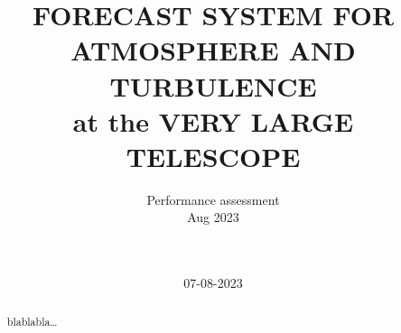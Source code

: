 \documentclass[a4paper]{article}
\title{FORECAST SYSTEM FOR ATMOSPHERE AND TURBULENCE\\
at the VERY LARGE TELESCOPE}
\author{
\vspace{1.0cm}
\begin{minipage}{9.5cm}
\begin{center}
\LARGE{Performance assessment}\\
\LARGE{Aug 2023}\\
\end{center}
\end{minipage}\\
\vspace{3cm}
}
\date{07-08-2023}
\begin{document}
 
\maketitle 

\begin{abstract}
blablabla\ldots
\end{abstract}

\contents     %



%
%
%
%
%
%
%
%
%
%
%





\end{document}
